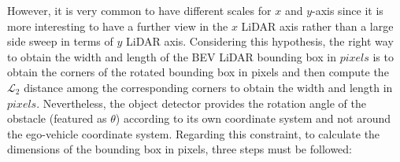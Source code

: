 However, it is very common to have different scales for $\textit{x}$ and $\textit{y}$-axis since it is more interesting to have a further view in the $\textit{x}$ \ac{LiDAR} axis rather than a large side sweep in terms of $\textit{y}$ \ac{LiDAR} axis. Considering this hypothesis, the right way to obtain the width and length of the \ac{BEV} \ac{LiDAR} bounding box in $\textit{pixels}$ is to obtain the corners of the rotated bounding box in pixels and then compute the $\mathcal{L}_2$ distance among the corresponding corners to obtain the width and length in $\textit{pixels}$. Nevertheless, the object detector provides the rotation angle of the obstacle (featured as $\theta$) according to its own coordinate system and not around the ego-vehicle coordinate system. Regarding this constraint, to calculate the dimensions of the bounding box in pixels, three steps must be followed:

